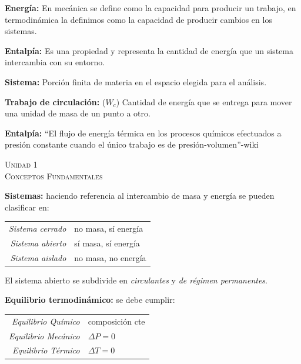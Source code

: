 \documentclass[11pt,a4paper,twocolumn]{article}
\newcommand{\unidad}[2]{\begin{center}
		\fontsize{10}{10}\selectfont\color{gray!50!black}\scshape Unidad #1 \\
		\fontsize{14}{14}\selectfont \scshape #2
\end{center}}
\begin{document}
	\textbf{Energía:} En mecánica se define como la capacidad para producir un trabajo, en termodinámica la definimos como la capacidad de producir cambios en los sistemas.
	
	\textbf{Entalpía:} Es una propiedad y representa la cantidad de energía que un sistema intercambia con su entorno.
	
	\textbf{Sistema:} Porción finita de materia en el espacio elegida para el análisis.
	
	\textbf{Trabajo de circulación:} ($W_c$) Cantidad de energía que se entrega para mover una unidad de masa de un punto a otro.
	
	\textbf{Entalpía:} ``El flujo de energía térmica en los procesos químicos efectuados a presión constante cuando el único trabajo es de presión-volumen''-wiki
	\newpage
	
	

	\unidad{1}{Conceptos Fundamentales}
	
	\textbf{Sistemas:} haciendo referencia al intercambio de masa y energía se pueden clasificar en:
	\begin{center}
		\begin{tabular}{r | l} \vspace{.2cm}
			\textsl{Sistema cerrado} & no masa, sí energía\\ \vspace{.2cm}
			\textsl{Sistema abierto} & sí masa, sí energía\\ \vspace{.2cm}
			\textsl{Sistema aislado} & no masa, no energía\\ 
		\end{tabular}
	\end{center}
	
	El sistema abierto se subdivide en \emph{circulantes} y \emph{de régimen permanentes}.
	
	\textbf{Equilibrio termodinámico:} se debe cumplir:\\
	
		\begin{tabular}{r | l} \vspace{.2cm}
		\textsl{Equilibrio Químico} & composición cte \\ \vspace{.2cm}
		\textsl{Equilibrio Mecánico} & $\Delta P =0$ \\ \vspace{.2cm}
		\textsl{Equilibrio Térmico} & $\Delta T =0$
	\end{tabular}
	
\end{document}
